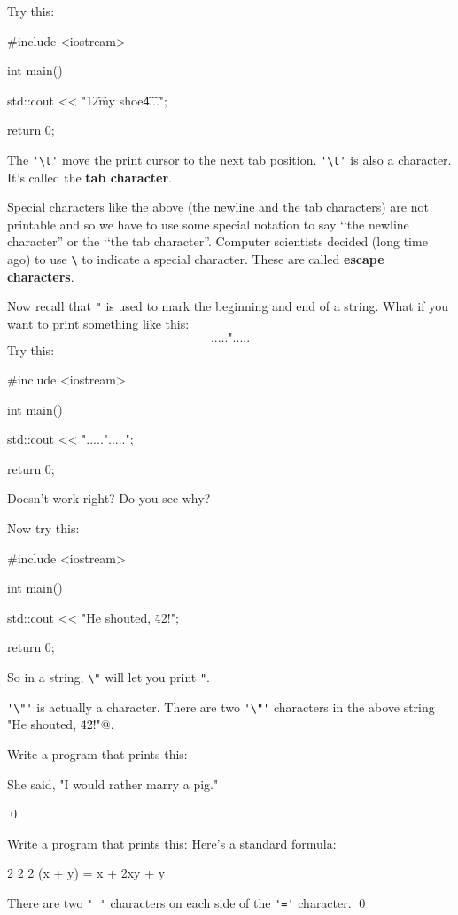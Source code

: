 Try this:
\begin{console}
#include <iostream>

int main()
{
    std::cout << "1\t2\tbuckle my shoe\t4\t...\n";

    return 0;
}
\end{console}

The \verb!'\t'! move the print cursor to the next tab position. 
\verb!'\t'! is also a character. 
It's called the \textbf{tab character}.

Special characters like the above (the newline and the tab characters) are not printable and so we have to use some special notation to say 
\lq\lq the newline character'' or the 
\lq\lq the tab character''. 
Computer scientists decided (long time ago) to use 
\verb!\! to indicate a special character. 
These are called \textbf{escape characters}.

Now recall that \verb!"! is used to mark the beginning and end of a string. What if you want to print something like this:
\[
	\texttt{.....".....}
\]
Try this:
\begin{console}
#include <iostream>

int main()
{
    std::cout << ".....".....";

    return 0;
}
\end{console}
Doesn't work right? Do you see why?

Now try this:
\begin{console}
#include <iostream>

int main()
{
    std::cout << "He shouted, \"42!\"\n";

    return 0;
}
\end{console}

So in a string, \verb!\"! will let you print \verb!"!. 

\verb!'\"'! is actually a character. 
There are two \verb!'\"'! characters in the above string  
\verb@"He shouted, \"42!\"\n"@.

\begin{ex}
Write a program that prints this:
\begin{console}
She said, "I would rather marry a pig."
\end{console}
\qed
\end{ex}
\begin{ex}
Write a program that prints this:
Here's a standard formula:
\begin{console}
       2      2          2
(x + y)   =  x  + 2xy + y
\end{console}
There are two \verb!' '! characters on each side of the 
\verb!'='! character.
\qed
\end{ex}

